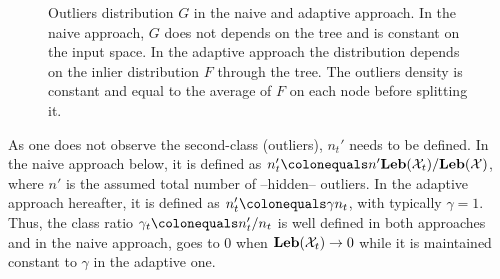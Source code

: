 \begin{figure}[!ht]
{}
  \caption[Outliers distribution $G$ in the naive and adaptive approach.
  ]{Outliers distribution $G$ in the naive and adaptive approach.  In the naive
  approach, $G$ does not depends on the tree and is constant on the input
  space. In the adaptive approach the distribution depends on the inlier
  distribution $F$ through the tree. The outliers density is constant and equal
  to the average of $F$ on each node before splitting it.
  \label{ocrf:fig:outlier_density}}
\end{figure}
%
%
As one does not observe the second-class (outliers), $n_t'$ needs to be
defined. In the naive approach below, it is defined as $n_t'\colonequals n'
\Leb(\mathcal{X}_t) / \Leb(\mathcal{X})$, where $n'$ is the assumed total
number of --hidden-- outliers.
%
In the adaptive approach hereafter, it is defined as $n_t' \colonequals \gamma
n_t$, with typically $\gamma=1$. Thus, the class ratio $\gamma_t \colonequals
n_t'/n_t$ is well defined in both approaches and in the naive approach, goes to
$0$ when $\mathbf{Leb}(\mathcal{X}_t) \to 0$ while it is maintained constant
to $\gamma$ in the adaptive one.

